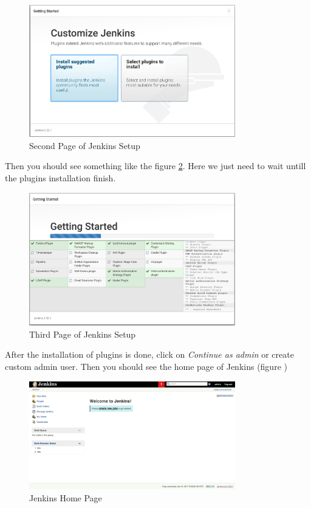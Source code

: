 \begin{figure}[H]
	\centering
    \includegraphics[width=0.8\textwidth]{grafiken/jenkins-02}
    \caption{Second Page of Jenkins Setup}
    \label{fig:jenkins-02}
\end{figure}

Then you should see something like the figure \ref{fig:jenkins-03}. Here we just need to wait untill the plugins installation finish.

\begin{figure}[H]
	\centering
    \includegraphics[width=0.8\textwidth]{grafiken/jenkins-03}
    \caption{Third Page of Jenkins Setup}
    \label{fig:jenkins-03}
\end{figure}

After the installation of plugins is done, click on \textit{Continue as admin} or create custom admin user. Then you should see the home page of Jenkins (figure )

\begin{figure}[H]
	\centering
    \includegraphics[width=0.8\textwidth]{grafiken/jenkins-04}
    \caption{Jenkins Home Page}
    \label{fig:jenkins-04}
\end{figure}

